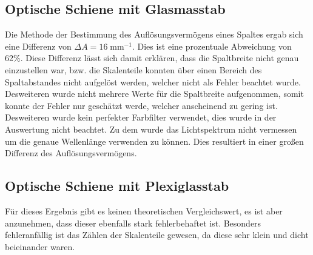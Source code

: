 \documentclass[12pt,a4paper,titlepage,headinclude]{scrartcl}
\numberwithin{equation}{subsection}
\begin{document}
\subsection{Optische Schiene mit Glasmasstab}
Die Methode der Bestimmung des Auflösungsvermögens eines Spaltes ergab sich eine Differenz von $\Delta A=16\;\text{mm}^{-1}$.
Dies ist eine prozentuale Abweichung von 62\%.
Diese Differenz lässt sich damit erklären, dass die Spaltbreite nicht genau einzustellen war, bzw. die Skalenteile konnten über einen Bereich des Spaltabstandes nicht aufgelöst werden, welcher nicht als Fehler beachtet wurde.
Desweiteren wurde nicht mehrere Werte für die Spaltbreite aufgenommen, somit konnte der Fehler nur geschätzt werde, welcher anscheinend zu gering ist.
Desweiteren wurde kein perfekter Farbfilter verwendet, dies wurde in der Auswertung nicht beachtet.
Zu dem wurde das Lichtspektrum nicht vermessen um die genaue Wellenlänge verwenden zu können.
Dies resultiert in einer großen Differenz des Auflösungsvermögens.

\subsection{Optische Schiene mit Plexiglasstab}
Für dieses Ergebnis gibt es keinen theoretischen Vergleichswert, es ist aber anzunehmen, dass dieser ebenfalls stark fehlerbehaftet ist.
Besonders fehleranfällig ist das Zählen der Skalenteile gewesen, da diese sehr klein und dicht beieinander waren.

\newpage
\printbibliography[heading=bibintoc]
\end{document}
